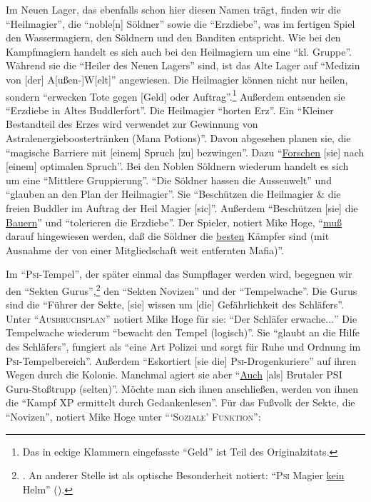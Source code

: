 \documentclass[a5paper,pagesize,numbers=noenddot]{scrbook}
\begin{document}
Im Neuen Lager, das ebenfalls schon hier diesen Namen trägt, finden wir die \enquote{Heilmagier},\autocite[S.~7]{orpheus_gildensystem} die \enquote{noble[n] Söldner}\autocite[S.~8]{orpheus_gildensystem} sowie die \enquote{Erzdiebe},\autocite[S.~9]{orpheus_gildensystem} was im fertigen Spiel den Wassermagiern, den Söldnern und den Banditen entspricht.
Wie bei den Kampfmagiern handelt es sich auch bei den Heilmagiern um eine \enquote{kl. Gruppe}.
Während sie die \enquote{Heiler des Neuen Lagers} sind, ist das Alte Lager auf \enquote{Medizin von [der] A[ußen-]W[elt]} angewiesen.
Die Heilmagier können nicht nur heilen, sondern \enquote{erwecken Tote gegen [Geld] oder Auftrag}.\footnote{Das in eckige Klammern eingefasste \enquote{Geld} ist Teil des Originalzitats.}
Außerdem entsenden sie \enquote{Erzdiebe in Altes Buddlerfort}.
Die Heilmagier \enquote{horten Erz}.
Ein \enquote{Kleiner Bestandteil des Erzes wird verwendet zur Gewinnung von Astralenergieboostertränken (Mana Potions)}.
Davon abgesehen planen sie, die \enquote{magische Barriere mit [einem] Spruch [zu] bezwingen}.
Dazu \enquote{\uline{Forschen} [sie] nach [einem] optimalen Spruch}.\autocite[S.~7]{orpheus_gildensystem}
Bei den Noblen Söldnern wiederum handelt es sich um eine \enquote{Mittlere Gruppierung}.
\enquote{Die Söldner hassen die Aussenwelt} und \enquote{glauben an den Plan der Heilmagier}.
Sie \enquote{Beschützen die Heilmagier \& die freien Buddler im Auftrag der Heil Magier [sic]}. Außerdem \enquote{Beschützen [sie] die \uline{Bauern}} und \enquote{tolerieren die Erzdiebe}.
Der Spieler, notiert Mike Hoge, \enquote{\uline{muß} darauf hingewiesen werden, daß die Söldner die \uline{besten} Kämpfer sind (mit Ausnahme der von einer Mitgliedschaft weit entfernten Mafia)}.\autocite[S.~8]{orpheus_gildensystem}

Im \enquote{\textsc{Psi}-Tempel}, der später einmal das Sumpflager werden wird, begegnen wir den \enquote{Sekten Gurus},\footnote{\autocite[S.~11]{orpheus_gildensystem}. An anderer Stelle ist als optische Besonderheit notiert: \enquote{\textsc{Psi} Magier \uline{kein} Helm} (\autocite[S.~7]{orpheus_b_scribbles}).} den \enquote{Sekten Novizen}\autocite[S.~10]{orpheus_gildensystem} und der \enquote{Tempelwache}.\autocite[S.~12]{orpheus_gildensystem}
Die Gurus sind die \enquote{Führer der Sekte, [sie] wissen um [die] Gefährlichkeit des Schläfers}.
Unter \enquote{\textsc{Ausbruchsplan}} notiert Mike Hoge für sie: \enquote{Der Schläfer erwache$\ldots$}
Die Tempelwache wiederum \enquote{bewacht den Tempel (logisch)}.
Sie \enquote{glaubt an die Hilfe des Schläfers}, fungiert als \enquote{eine Art Polizei und sorgt für Ruhe und Ordnung im \textsc{Psi}-Tempelbereich}.
Außerdem \enquote{Eskortiert [sie die] \textsc{Psi}-Drogenkuriere} auf ihren Wegen durch die Kolonie.
Manchmal agiert sie aber \enquote{\uline{Auch} [als] Brutaler \textsc{PSI} Guru-Stoßtrupp (selten)}.
Möchte man sich ihnen anschließen, werden von ihnen die \enquote{Kampf XP ermittelt durch Gedankenlesen}.
Für das Fußvolk der Sekte, die \enquote{Novizen}, notiert Mike Hoge unter \enquote{\enquote{\textsc{Soziale}} \textsc{Funktion}}:
\end{document}

